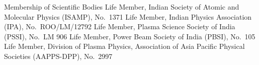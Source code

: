 \begin{rubric}{Membership of Scientific Bodies}
\entry*[] Life Member, Indian Society of Atomic and Molecular Physics (ISAMP), No.\ 1371
\entry*[] Life Member, Indian Physics Association (IPA), No.\ ROO/LM/12792
\entry*[] Life Member, Plasma Science Society of India (PSSI), No.\ LM 906
\entry*[] Life Member, Power Beam Society of India (PBSI), No.\ 105
\entry*[] Life Member, Division of Plasma Physics, Association of Asia Pacific Physical Societies (AAPPS-DPP), No.\ 2997
\end{rubric}
